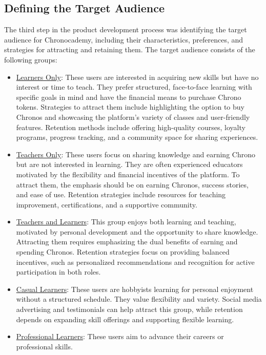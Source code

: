 \subsection{Defining the Target Audience}\label{subsec:target-audience}

The third step in the product development process was identifying the target audience for Chronocademy, including their characteristics, preferences, and strategies for attracting and retaining them.
The target audience consists of the following groups:

\begin{itemize}
    \item \underline{Learners Only}: These users are interested in acquiring new skills but have no interest or time to teach.
    They prefer structured, face-to-face learning with specific goals in mind and have the financial means to purchase Chrono tokens.
    Strategies to attract them include highlighting the option to buy Chronos and showcasing the platform’s variety of classes and user-friendly features.
    Retention methods include offering high-quality courses, loyalty programs, progress tracking, and a community space for sharing experiences.
    \item \underline{Teachers Only}: These users focus on sharing knowledge and earning Chrono but are not interested in learning.
    They are often experienced educators motivated by the flexibility and financial incentives of the platform.
    To attract them, the emphasis should be on earning Chronos, success stories, and ease of use.
    Retention strategies include resources for teaching improvement, certifications, and a supportive community.
    \item \underline{Teachers and Learners}: This group enjoys both learning and teaching, motivated by personal development and the opportunity to share knowledge.
    Attracting them requires emphasizing the dual benefits of earning and spending Chronos.
    Retention strategies focus on providing balanced incentives, such as personalized recommendations and recognition for active participation in both roles.
    \item \underline{Casual Learners}: These users are hobbyists learning for personal enjoyment without a structured schedule.
    They value flexibility and variety.
    Social media advertising and testimonials can help attract this group, while retention depends on expanding skill offerings and supporting flexible learning.
    \item \underline{Professional Learners}: These users aim to advance their careers or professional skills.

\end{itemize}
